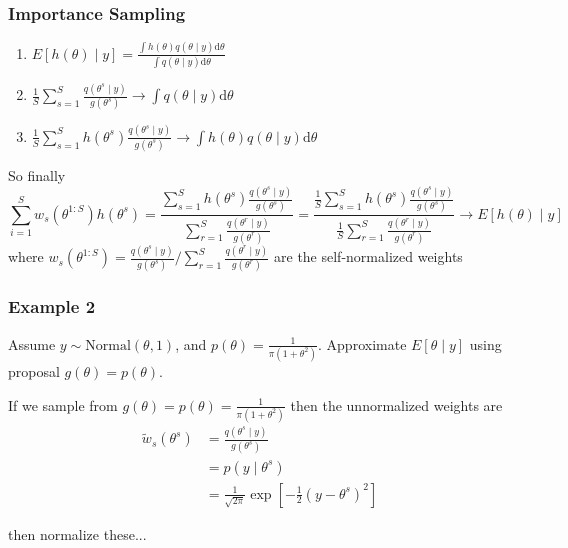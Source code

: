 \documentclass{beamer}
\begin{document}
\begin{frame}[fragile]
\frametitle{Importance Sampling}

\begin{enumerate}
\item $E[h(\theta) \mid y] = \frac{\int h(\theta) q(\theta \mid y) \text{d}\theta }{\int q(\theta \mid y) \text{d}\theta } $
\item $\frac{1}{S}\sum_{s=1}^S \frac{q(\theta^s \mid y)}{g(\theta^s)} \to \int q(\theta \mid y) \text{d}\theta$ 
\item $\frac{1}{S}\sum_{s=1}^S h(\theta^s) \frac{q(\theta^s \mid y)}{g(\theta^s)} \to \int h(\theta)q(\theta \mid y) \text{d}\theta$
\end{enumerate}

So finally
\[
\sum_{i=1}^S w_s(\theta^{1:S})h(\theta^s)
=
\frac{
\sum_{s=1}^S h(\theta^s) \frac{q(\theta^s \mid y)}{g(\theta^s)}}{
\sum_{r=1}^S \frac{q(\theta^{r} \mid y)}{g(\theta^{r})}  
}
=
\frac{
\frac{1}{S}\sum_{s=1}^S h(\theta^s) \frac{q(\theta^s \mid y)}{g(\theta^s)}}{
\frac{1}{S}\sum_{r=1}^S \frac{q(\theta^{r} \mid y)}{g(\theta^{r})}  
}
\to E[h(\theta) \mid y]
\]
where $w_s(\theta^{1:S}) = \frac{q(\theta^s \mid y)}{g(\theta^s)} \bigg/ \sum_{r=1}^S \frac{q(\theta^{r} \mid y)}{g(\theta^{r})}  $ are the self-normalized weights

\end{frame}


\begin{frame}[fragile]
\frametitle{Example 2}

Assume $y \sim \text{Normal}(\theta,1)$, and $p(\theta) = \frac{1}{\pi(1+\theta^2)}$. Approximate $E[\theta \mid y]$ using proposal $g(\theta) = p(\theta)$.
\newline
\pause

If we sample from $g(\theta) = p(\theta) = \frac{1}{\pi(1+\theta^2)}$ then the unnormalized weights are
\begin{align*}
\tilde{w}_s(\theta^{s}) &= \frac{ q(\theta^s \mid y)}{g(\theta^s)}  \\
&= p(y \mid \theta^s )  \\
&= \frac{1}{\sqrt{2\pi}} \exp\left[-\frac{1}{2} (y-\theta^s)^2 \right] 
\end{align*}
\pause

then normalize these...

\end{frame}
\end{document}

